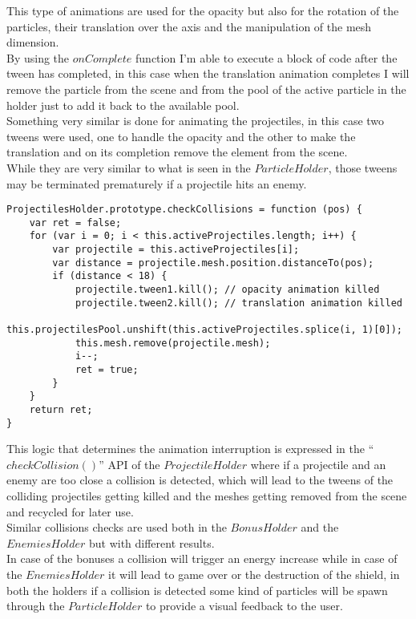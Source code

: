 \documentclass[a4paper,11pt]{article}
\begin{document}
This type of animations are used for the opacity but also for the rotation of the particles, their translation over the axis and the manipulation of the mesh dimension.\\
By using the $onComplete$ function I'm able to execute a block of code after the tween has completed, in this case when the translation animation completes I will remove the particle from the scene and from the pool of the active particle in the holder just to add it back to the available pool.\\
Something very similar is done for animating the projectiles, in this case two tweens were used, one to handle the opacity and the other to make the translation and on its completion remove the element from the scene.\\
While they are very similar to what is seen in the $ParticleHolder$, those tweens may be terminated prematurely if a projectile hits an enemy.
\begin{verbatim}
ProjectilesHolder.prototype.checkCollisions = function (pos) {
    var ret = false;
    for (var i = 0; i < this.activeProjectiles.length; i++) {
        var projectile = this.activeProjectiles[i];
        var distance = projectile.mesh.position.distanceTo(pos);
        if (distance < 18) {
            projectile.tween1.kill(); // opacity animation killed
            projectile.tween2.kill(); // translation animation killed
            this.projectilesPool.unshift(this.activeProjectiles.splice(i, 1)[0]);
            this.mesh.remove(projectile.mesh);
            i--;
            ret = true;
        }
    }
    return ret;
}
\end{verbatim}
This logic that determines the animation interruption is expressed in the ``$checkCollision()$'' API of the $ProjectileHolder$ where if a projectile and an enemy are too close a collision is detected, which will lead to the tweens of the colliding projectiles getting killed and the meshes getting removed from the scene and recycled for later use.\\
Similar collisions checks are used both in the $BonusHolder$ and the $EnemiesHolder$ but with different results.\\
In case of the bonuses a collision will trigger an energy increase while in case of the $EnemiesHolder$ it will lead to game over or the destruction of the shield, in both the holders if a collision is detected some kind of particles will be spawn through the $ParticleHolder$ to provide a visual feedback to the user.
\end{document}
